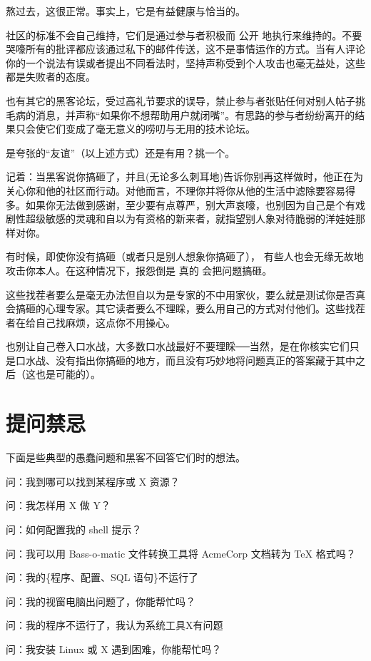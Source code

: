 熬过去，这很正常。事实上，它是有益健康与恰当的。

社区的标准不会自己维持，它们是通过参与者积极而 公开 地执行来维持的。不要哭嚎所有的批评都应该通过私下的邮件传送，这不是事情运作的方式。当有人评论你的一个说法有误或者提出不同看法时，坚持声称受到个人攻击也毫无益处，这些都是失败者的态度。

也有其它的黑客论坛，受过高礼节要求的误导，禁止参与者张贴任何对别人帖子挑毛病的消息，并声称“如果你不想帮助用户就闭嘴”。有思路的参与者纷纷离开的结果只会使它们变成了毫无意义的唠叨与无用的技术论坛。

是夸张的“友谊”（以上述方式）还是有用？挑一个。

记着：当黑客说你搞砸了，并且(无论多么刺耳地)告诉你别再这样做时，他正在为关心你和他的社区而行动。对他而言，不理你并将你从他的生活中滤除要容易得多。如果你无法做到感谢，至少要有点尊严，别大声哀嚎，也别因为自己是个有戏剧性超级敏感的灵魂和自以为有资格的新来者，就指望别人象对待脆弱的洋娃娃那样对你。

有时候，即使你没有搞砸（或者只是别人想象你搞砸了）， 有些人也会无缘无故地攻击你本人。在这种情况下，报怨倒是 真的 会把问题搞砸。

这些找茬者要么是毫无办法但自以为是专家的不中用家伙，要么就是测试你是否真会搞砸的心理专家。其它读者要么不理睬，要么用自己的方式对付他们。这些找茬者在给自己找麻烦，这点你不用操心。

也别让自己卷入口水战，大多数口水战最好不要理睬──当然，是在你核实它们只是口水战、没有指出你搞砸的地方，而且没有巧妙地将问题真正的答案藏于其中之后（这也是可能的）。



\section{提问禁忌}

下面是些典型的愚蠢问题和黑客不回答它们时的想法。

问：我到哪可以找到某程序或 X 资源？

问：我怎样用 X 做 Y？

问：如何配置我的 shell 提示？

问：我可以用 Bass-o-matic 文件转换工具将 AcmeCorp 文档转为 TeX 格式吗？

问：我的\{程序、配置、SQL 语句\}不运行了

问：我的视窗电脑出问题了，你能帮忙吗？

问：我的程序不运行了，我认为系统工具X有问题

问：我安装 Linux 或 X 遇到困难，你能帮忙吗？

